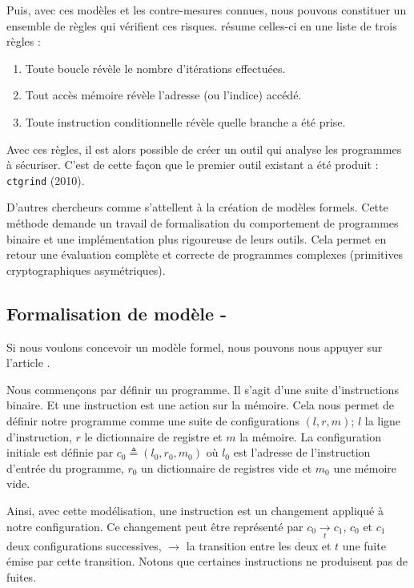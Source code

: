 Puis, avec ces modèles et les contre-mesures connues, nous pouvons constituer un ensemble de règles qui vérifient ces risques. \cite{CTsaferCrypto} résume celles-ci en une liste de trois règles :
\begin{enumerate}
  \item Toute boucle révèle le nombre d'itérations effectuées. 
  \item Tout accès mémoire révèle l'adresse (ou l'indice) accédé.
  \item Toute instruction conditionnelle révèle quelle branche a été prise.
\end{enumerate}

Avec ces règles, il est alors possible de créer un outil qui analyse les programmes à sécuriser. C'est de cette façon que le premier outil existant a été produit : \texttt{ctgrind} (2010).\medbreak

D'autres chercheurs comme \citeauthor{binsecRel2019} \cite{binsecRel2019} s'attellent à la création de modèles formels. Cette méthode demande un travail de formalisation du comportement de programmes binaire et une implémentation plus rigoureuse de leurs outils. Cela permet en retour une évaluation complète et correcte de programmes complexes (\ie primitives cryptographiques asymétriques).

\subsection*{Formalisation de modèle - \cite{binsecRel2019}}

Si nous voulons concevoir un modèle formel, nous pouvons nous appuyer sur l'article  \cite{formalConstantTime}.\medbreak


Nous commençons par définir un programme. Il s'agit d'une suite d'instructions binaire. Et une instruction est une action sur la mémoire. Cela nous permet de définir notre programme comme une suite de configurations $(l,r,m)$; $l$ la ligne d'instruction, $r$ le dictionnaire de registre et $m$ la mémoire. La configuration initiale est définie par $c_0 \triangleq (l_0,r_0,m_0)$ où $l_0$ est l'adresse de l'instruction d'entrée du programme, $r_0$ un dictionnaire de registres vide et $m_0$ une mémoire vide.\smallbreak

Ainsi, avec cette modélisation, une instruction est un changement appliqué à notre configuration. Ce changement peut être représenté par $ c_0 \underset{t}{\to} c_1 $, $c_0$ et $c_1$ deux configurations successives, $\to$ la transition entre les deux et $t$ une fuite émise par cette transition. Notons que certaines instructions ne produisent pas de fuites.\smallbreak

